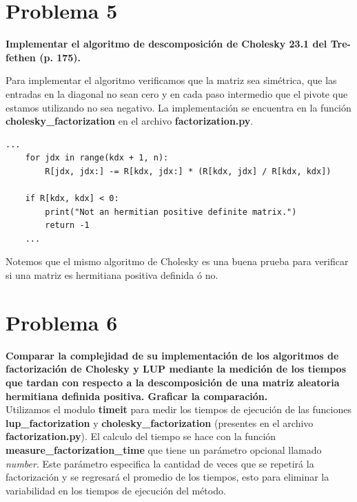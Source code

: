 \documentclass[12pt,letterpaper]{article}
\begin{document}
\section*{Problema 5}

\textbf{Implementar el algoritmo de descomposici\'on de Cholesky 23.1 del Tre-fethen (p. 175).}

Para implementar el algoritmo verificamos que la matriz sea sim\'etrica, que las entradas en la diagonal no sean cero y en cada paso intermedio que el pivote que estamos utilizando no sea negativo. La implementaci\'on se encuentra en la funci\'on \textbf{cholesky\_factorization} en el archivo \textbf{factorization.py}.
    \begin{lstlisting}[style = Python]
    ...
    for jdx in range(kdx + 1, n):
        R[jdx, jdx:] -= R[kdx, jdx:] * (R[kdx, jdx] / R[kdx, kdx])

    if R[kdx, kdx] < 0:
        print("Not an hermitian positive definite matrix.")
        return -1
    ...
    \end{lstlisting}
    
Notemos que el mismo algoritmo de Cholesky es una buena prueba para verificar si una matriz es hermitiana positiva definida \'o no.

\section*{Problema 6}

\textbf{Comparar la complejidad de su implementaci\'on de los algoritmos de factorizaci\'on de Cholesky y LUP mediante la medici\'on de los tiempos que tardan con respecto a la descomposici\'on de una matriz aleatoria hermitiana definida positiva. Graficar la comparaci\'on.}\\

Utilizamos el modulo \textbf{timeit} para medir los tiempos de ejecuci\'on de las funciones \textbf{lup\_factorization} y \textbf{cholesky\_factorization} (presentes en el archivo \textbf{factorization.py}). El calculo del tiempo se hace con la funci\'on \textbf{measure\_factorization\_time} que tiene un par\'ametro opcional llamado \textit{number}. Este par\'ametro especifica la cantidad de veces que se repetir\'a la factorizaci\'on y se regresar\'a el promedio de los tiempos, esto para eliminar la variabilidad en los tiempos de ejecuci\'on del m\'etodo.\\
\end{document}
